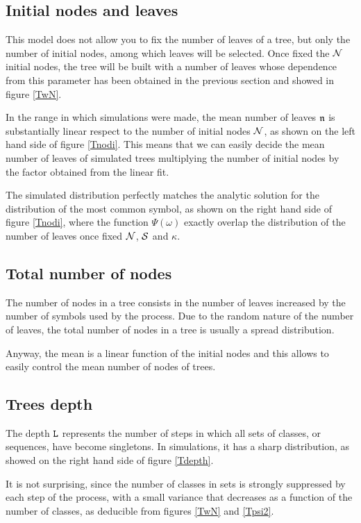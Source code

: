 \subsection{Initial nodes and leaves}
This model does not allow you to fix the number of leaves of a tree, but only the number of initial nodes, among which leaves will be selected. Once fixed the $\mathcal N$ initial nodes, the tree will be built with a number of leaves whose dependence from this parameter has been obtained in the previous section and showed in figure \ref{TwN}.

In the range in which simulations were made, the mean number of leaves $\mathfrak n$ is substantially linear respect to the number of initial nodes $\mathcal N$, as shown on the left hand side of figure \ref{Tnodi}. This means that we can easily decide the mean number of leaves of simulated trees multiplying the number of initial nodes by the factor obtained from the linear fit.

The simulated distribution perfectly matches the analytic solution for the distribution of the most common symbol, as shown on the right hand side of figure \ref{Tnodi}, where the function $\Psi (\omega)$ exactly overlap the distribution of the number of leaves once fixed $\mathcal N$, $\mathcal S$ and $\kappa$.

\subsection{Total number of nodes}
The number of nodes in a tree consists in the number of leaves increased by the number of symbols used by the process. Due to the random nature of the number of leaves, the total number of nodes in a tree is usually a spread distribution.

Anyway, the mean is a linear function of the initial nodes and this allows to easily control the mean number of nodes of trees.

\subsection{Trees depth}
The depth $\mathtt L$ represents the number of steps in which all sets of classes, or sequences, have become singletons. In simulations, it has a sharp distribution, as showed on the right hand side of figure \ref{Tdepth}.

It is not surprising, since the number of classes in sets is strongly suppressed by each step of the process, with a small variance that decreases as a function of the number of classes, as deducible from figures \ref{TwN} and \ref{Tpsi2}.

